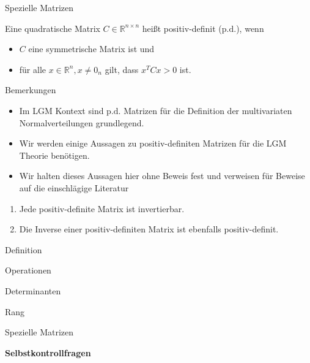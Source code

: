 \documentclass[
  8pt,
  ignorenonframetext,
]{beamer}
\providecommand{\tightlist}{%
  \setlength{\itemsep}{0pt}\setlength{\parskip}{0pt}}
\begin{document}
\begin{frame}{Spezielle Matrizen}
\protect\hypertarget{spezielle-matrizen-2}{}
\small
\begin{definition}
Eine quadratische Matrix $C \in \mathbb{R}^{n \times n}$ heißt positiv-definit ($\mbox{p.d.}$), wenn
\begin{itemize}
\item $C$ eine symmetrische Matrix ist und
\item für alle $x \in \mathbb{R}^n, x \neq 0_n$ gilt, dass $x^TCx > 0$ ist.
\end{itemize}
\end{definition}

\footnotesize

Bemerkungen

\begin{itemize}
\tightlist
\item
  Im LGM Kontext sind \(\mbox{p.d.}\) Matrizen für die Definition der
  multivariaten Normalverteilungen grundlegend.
\item
  Wir werden einige Aussagen zu positiv-definiten Matrizen für die LGM
  Theorie benötigen.
\item
  Wir halten dieses Aussagen hier ohne Beweis fest und verweisen für
  Beweise auf die einschlägige Literatur
\end{itemize}

\begin{enumerate}
[(1)]
\tightlist
\item
  Jede positiv-definite Matrix ist invertierbar.
\item
  Die Inverse einer positiv-definiten Matrix ist ebenfalls
  positiv-definit.
\end{enumerate}
\end{frame}

\begin{frame}{}
\protect\hypertarget{section-8}{}
\large
{}
\vfill

Definition

Operationen

Determinanten

Rang

Spezielle Matrizen

\textbf{Selbstkontrollfragen}

\vfill
\end{frame}
\end{document}
